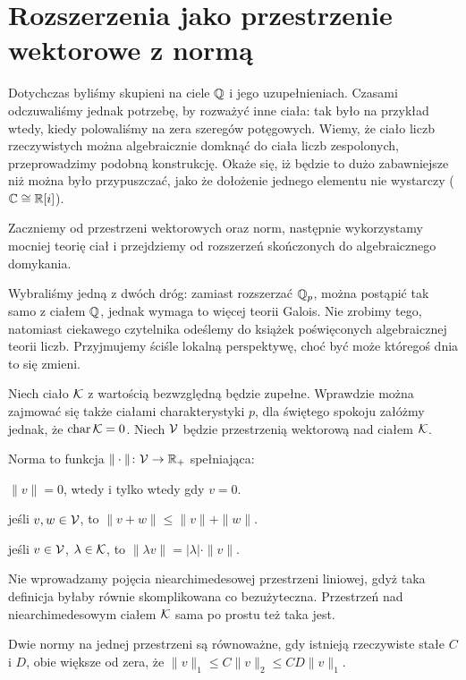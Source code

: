 \section{Rozszerzenia jako przestrzenie wektorowe z normą}
Dotychczas  byliśmy skupieni na ciele $\mathbb Q$ i jego uzupełnieniach.
Czasami odczuwaliśmy jednak potrzebę, by rozważyć inne ciała: tak było na przykład wtedy, kiedy polowaliśmy na zera szeregów potęgowych.
Wiemy, że ciało liczb rzeczywistych można algebraicznie domknąć do ciała liczb zespolonych, przeprowadzimy podobną konstrukcję.
Okaże się, iż będzie to dużo zabawniejsze niż można było przypuszczać, jako że dołożenie jednego elementu nie wystarczy ($\mathbb C \cong \mathbb R[i]$).

Zaczniemy od przestrzeni wektorowych oraz norm, następnie wykorzystamy mocniej teorię ciał i przejdziemy od rozszerzeń skończonych do algebraicznego domykania.

Wybraliśmy jedną z dwóch dróg: zamiast rozszerzać $\mathbb Q_p$, można postąpić tak samo z ciałem $\mathbb Q$, jednak wymaga to więcej teorii Galois.
Nie zrobimy tego, natomiast ciekawego czytelnika odeślemy do książek poświęconych algebraicznej teorii liczb.
Przyjmujemy ściśle lokalną perspektywę, choć być może któregoś dnia to się zmieni.

Niech ciało $\mathcal K$ z wartością bezwzględną będzie zupełne.
Wprawdzie można zajmować się także ciałami charakterystyki $p$, dla świętego spokoju załóżmy jednak, że $\operatorname{char} \mathcal K = 0$.
Niech $\mathcal V$ będzie przestrzenią wektorową nad ciałem $\mathcal K$.

\begin{definicja}
	Norma to funkcja $\|\cdot\| \colon \mathcal V \to \mathbb R_+$ spełniająca:
	\begin{enumx}
	\item $\|v\| = 0$, wtedy i tylko wtedy gdy $v = 0$.
	\item jeśli $v, w \in \mathcal V$, to $\|v+w\| \le \|v\| + \|w\|$.
	\item jeśli $v \in \mathcal V$, $\lambda \in \mathcal K$, to $\|\lambda v\| = |\lambda| \cdot \|v\|$.
	\end{enumx}
\end{definicja}

Nie wprowadzamy pojęcia niearchimedesowej przestrzeni liniowej, gdyż taka definicja byłaby równie skomplikowana co bezużyteczna.
Przestrzeń nad niearchimedesowym ciałem $\mathcal K$ sama po prostu też taka jest.

\begin{definicja}
	Dwie normy na jednej przestrzeni są równoważne, gdy istnieją rzeczywiste stałe $C$ i $D$, obie większe od zera, że $\|v\|_1 \le C\|v\|_2 \le CD \|v\|_1$.
\end{definicja}

